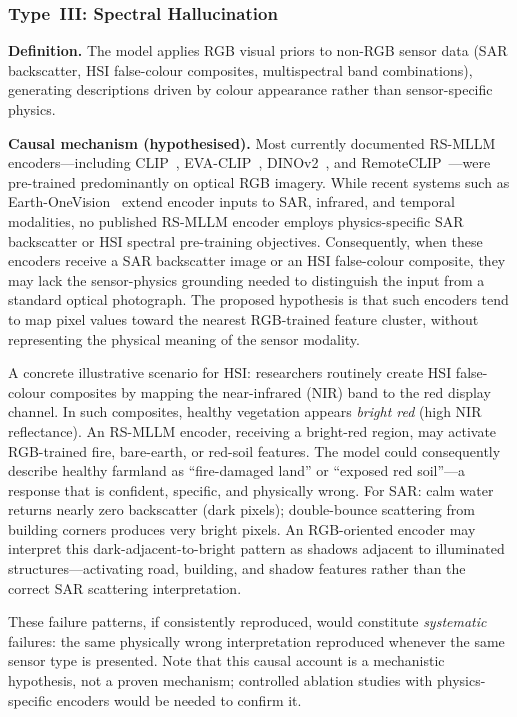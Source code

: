 \subsubsection{Type~III: Spectral Hallucination}\label{sec7:type3}

\textbf{Definition.}
The model applies RGB visual priors to non-RGB sensor data (SAR
backscatter, HSI false-colour composites, multispectral band
combinations), generating descriptions driven by colour appearance
rather than sensor-specific physics.

\textbf{Causal mechanism (hypothesised).}
Most currently documented RS-MLLM encoders---including
CLIP~\cite{clip2021}, EVA-CLIP~\cite{fang2023evaclip},
DINOv2~\cite{oquab2023dinov2}, and RemoteCLIP~\cite{remoteclip2024}---were
pre-trained predominantly on optical RGB imagery.
While recent systems such as Earth-OneVision~\cite{earthonevision2026} extend
encoder inputs to SAR, infrared, and temporal modalities, no published RS-MLLM
encoder employs physics-specific SAR backscatter or HSI spectral pre-training
objectives. Consequently, when these encoders receive a SAR backscatter image or
an HSI false-colour composite, they may lack the sensor-physics grounding needed
to distinguish the input from a standard optical photograph. The proposed
hypothesis is that such encoders tend to map pixel values toward the nearest
RGB-trained feature cluster, without representing the physical meaning of the
sensor modality.

A concrete illustrative scenario for HSI: researchers routinely create HSI
false-colour composites by mapping the near-infrared (NIR) band to the
red display channel. In such composites, healthy vegetation appears
\emph{bright red} (high NIR reflectance). An RS-MLLM encoder, receiving
a bright-red region, may activate RGB-trained fire, bare-earth, or
red-soil features. The model could consequently describe healthy farmland as
``fire-damaged land'' or ``exposed red soil''---a response that is
confident, specific, and physically wrong. For SAR: calm water returns
nearly zero backscatter (dark pixels); double-bounce scattering from
building corners produces very bright pixels. An RGB-oriented encoder
may interpret this dark-adjacent-to-bright pattern as shadows adjacent to
illuminated structures---activating road, building, and shadow features
rather than the correct SAR scattering interpretation.

These failure patterns, if consistently reproduced, would constitute
\emph{systematic} failures: the same physically wrong interpretation reproduced
whenever the same sensor type is presented. Note that this causal account
is a mechanistic hypothesis, not a proven mechanism; controlled ablation
studies with physics-specific encoders would be needed to confirm it.

